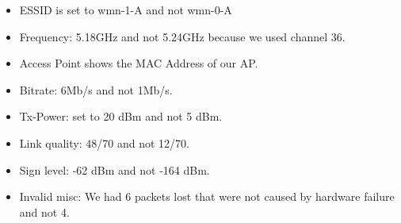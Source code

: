 \begin {itemize}
\item ESSID is set to wmn-1-A and not wmn-0-A
\item Frequency: 5.18GHz and not 5.24GHz because we used channel 36.
\item Access Point shows the MAC Address of our AP.
\item Bitrate: 6Mb/s and not 1Mb/s.
\item Tx-Power: set to 20 dBm and not 5 dBm.
\item Link quality: 48/70 and not 12/70.
\item Sign level: -62 dBm and not -164 dBm.
\item Invalid misc: We had 6 packets lost that were not caused by hardware failure and not 4.
\end{itemize}
